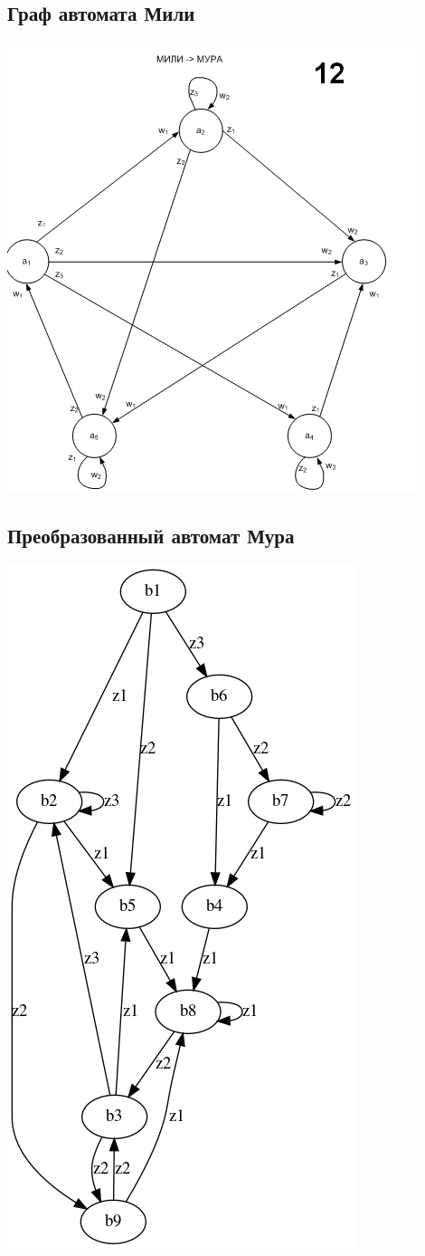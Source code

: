    \subsection{Граф автомата Мили}
	\includegraphics{img/mealy.png}
    \subsection{Преобразованный автомат Мура}
	\includegraphics[width=200bp]{img/moore.png}
\newpage
